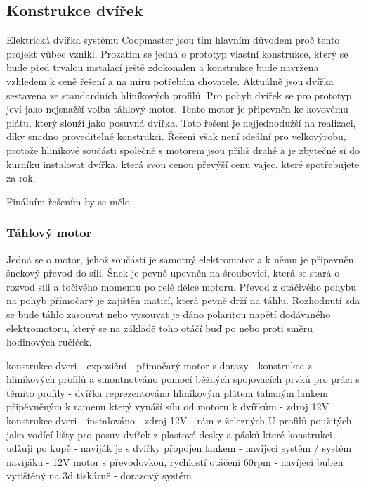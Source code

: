 
\subsection{Konstrukce dvířek}\label{subsec:konstrukce-dvirek}
Elektrická dvířka systému Coopmaster jsou tím hlavním důvodem proč tento projekt vůbec vznikl.
Prozatím se jedná o prototyp vlastní konstrukce, který se bude před trvalou instalací ještě zdokonalen a konstrukce bude navržena vzhledem k ceně řešení a na míru potřebám chovatele.
Aktuálně jsou dvířka sestavena ze standardních hliníkových profilů.
Pro pohyb dvířek se pro prototyp jeví jako nejsnažší volba táhlový motor.
Tento motor je připevněn ke kovovému plátu, který slouží jako posuvná dvířka.
Toto řešení je nejjednodužší na realizaci, díky snadno proveditelné konstrukci.
Řešení však není ideální pro velkovýrobu, protože hliníkové součásti společně s motorem jsou příliš drahé a je zbytečné si do kurníku instalovat dvířka, která svou cenou převýší cenu vajec, které spotřebujete za rok.

Finálním řešením by se mělo
\subsubsection{Táhlový motor}
Jedná se o motor, jehož součástí je samotný elektromotor a k němu je připevněn šnekový převod do síli.
Šnek je pevně upevněn na šroubovici, která se stará o rozvod síli a točivého momentu po celé délce motoru.
Převod z otáčivého pohybu na pohyb přímočarý je zajištěn maticí, která pevně drží na táhlu.
Rozhodnutí zda se bude táhlo zasouvat nebo vysouvat je dáno polaritou napětí dodávaného elektromotoru, který se na základě toho otáčí buď po nebo proti směru hodinových ručiček.

konstrukce dveri - expoziční
- přímočarý motor s dorazy
- konstrukce z hliníkových profilů a smontnotváno pomocí běžných spojovacích prvků pro práci s těmito profily
- dvířka reprezentována hliníkovým plátem tahaným lankem připěvněným k ramenu který vynáší sílu od motoru k dvířkům
- zdroj 12V
konstrukce dveri - instalováno
- zdroj 12V
- rám z železných U profilů použitých jako vodící lišty pro posuv dvířek z plastové desky a pásků které konstrukci udžují po kupě
- naviják je s dvířky přopojen lankem
- navijecí systém / systém navijáku
- 12V motor s převodovkou, rychlostí otáčení 60rpm
- navíjecí buben vytištěný na 3d tiskárně
- dorazový systém
